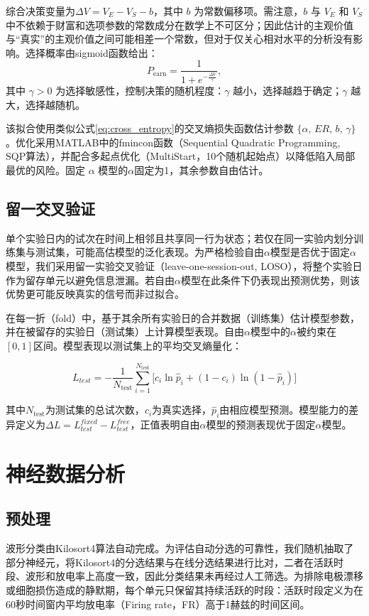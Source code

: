 综合决策变量为$\Delta V = V_{E} - V_{S} - b$，其中 $b$ 为常数偏移项。需注意，$b$ 与 $V_E$ 和 $V_S$ 中不依赖于财富和选项参数的常数成分在数学上不可区分；因此估计的主观价值与“真实”的主观价值之间可能相差一个常数，但对于仅关心相对水平的分析没有影响。选择概率由sigmoid函数给出：
\begin{equation}
P_{\text{earn}} = \frac{1}{1 + e^{-\frac{\Delta V}{\gamma}}},
\end{equation}
其中 $\gamma > 0$ 为选择敏感性，控制决策的随机程度：$\gamma$ 越小，选择越趋于确定；$\gamma$ 越大，选择越随机。

该拟合使用类似公式\eqref{eq:cross_entropy}的交叉熵损失函数估计参数 $\{\alpha, \, ER, \, b, \, \gamma\}$。优化采用MATLAB中的fmincon函数（Sequential Quadratic Programming, SQP算法），并配合多起点优化（MultiStart，10个随机起始点）以降低陷入局部最优的风险。固定 $\alpha$ 模型的$\alpha$固定为1，其余参数自由估计。

\subsection{留一交叉验证}\label{chap2:methods_BHV_LOO}
单个实验日内的试次在时间上相邻且共享同一行为状态；若仅在同一实验内划分训练集与测试集，可能高估模型的泛化表现。为严格检验自由$\alpha$模型是否优于固定$\alpha$模型，我们采用留一实验交叉验证（leave-one-session-out, LOSO），将整个实验日作为留存单元以避免信息泄漏。若自由$\alpha$模型在此条件下仍表现出预测优势，则该优势更可能反映真实的信号而非过拟合。

在每一折（fold）中，基于其余所有实验日的合并数据（训练集）估计模型参数，并在被留存的实验日（测试集）上计算模型表现。自由$\alpha$模型中的$\alpha$被约束在$[0,1]$区间。模型表现以测试集上的平均交叉熵量化：

\begin{equation}
    L_{test} = -\frac{1}{N_{\text{test}}} \sum_{i=1}^{N_{\text{test}}} \bigl[ c_i \ln \hat{p}_i + (1 - c_i) \ln(1 - \hat{p}_i) \bigr]
\end{equation}

其中$N_{\text{test}}$为测试集的总试次数，$c_i$为真实选择，$\hat{p}_i$由相应模型预测。模型能力的差异定义为$\Delta L = L^{fixed}_{test} - L^{free}_{test}$，正值表明自由$\alpha$模型的预测表现优于固定$\alpha$模型。

\section{神经数据分析}\label{chap2:methods_neural}
\subsection{预处理}\label{chap2:methods_neural_preprocess}
波形分类由Kilosort4算法\citep{pachitariu2024spike}自动完成。为评估自动分选的可靠性，我们随机抽取了部分神经元，将Kilosort4的分选结果与在线分选结果进行比对，二者在活跃时段、波形和放电率上高度一致，因此分类结果未再经过人工筛选。为排除电极漂移或细胞损伤造成的静默期，每个单元只保留其持续活跃的时段：活跃时段定义为在60秒时间窗内平均放电率（Firing rate，FR）高于1赫兹的时间区间。

